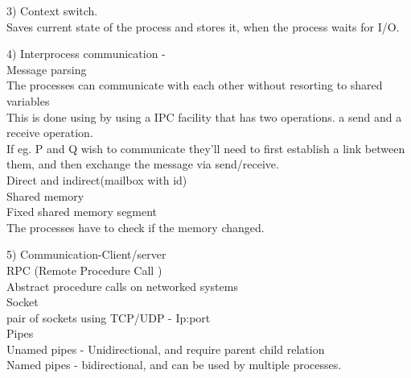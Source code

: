 \documentclass[a4paper,10pt,titlepage]{report}
\begin{document}
3) Context switch.\\
\hspace{10mm} Saves current state of the process and stores it, when the process waits for I/O.\\
\vspace{5mm}



4) Interprocess communication - \\
\hspace{10mm}	Message parsing \\
\hspace{15mm}  	The processes can communicate with each other without resorting to shared variables	\\
\hspace{15mm} 	This is done using by using a IPC facility that has two operations. a send and a receive operation.\\
\hspace{15mm} 	If eg. P and Q wish to communicate they'll need to first establish a link between them, and then exchange the message via send/receive. \\
\hspace{15mm} Direct and indirect(mailbox with id) \\


\hspace{10mm}	Shared memory \\
\hspace{15mm}	Fixed shared memory segment \\
\hspace{15mm}	The processes have to check if the memory changed. \\
\vspace{5mm}

5) Communication-Client/server\\

\hspace{10mm}	RPC (Remote Procedure Call )\\
\hspace{15mm}	Abstract procedure calls on networked systems \\
\hspace{10mm}	Socket \\
\hspace{15mm}	pair of sockets using TCP/UDP - Ip:port \\
\hspace{10mm}	Pipes\\
\hspace{15mm}   Unamed pipes - Unidirectional, and require parent child relation\\
\hspace{15mm} 	Named pipes - bidirectional, and can be used by multiple processes. \\
\vspace{5mm}
\end{document}
